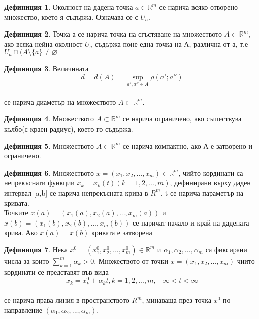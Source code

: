\documentclass[a4paper,fleqn,12pt]{article}
\theoremstyle{definition}
\newtheorem{definition}{Дефиниция}[subsection]
\begin{document}
\begin{definition}
Околност на дадена точка $a \in \mathbb{R}^m $ се нарича всяко отворено множество, което я съдържа. Означава се с $U_a$.
\end{definition}

\begin{definition}
Точка а се нарича точка на сгъстяване на множеството $A \subset \mathbb{R}^m $, ако всяка нейна околност $U_a$ съдържа поне една точка на А, различна от а, т.е $U_a \cap (A\setminus \{ a \} \neq \varnothing $
\end{definition}

\begin{definition}
Величината \\
$$d = d(A) = \sup_{a',a'' \in A} \rho(a';a'')$$\\
се нарича диаметър на множеството  $A \subset \mathbb{R}^m $.
\end{definition}

\begin{definition}
Множеството  $A \subset \mathbb{R}^m $ се нарича ограничено, ако съшествува кълбо(с краен радиус), което го съдържа.
\end{definition}

\begin{definition}
Множеството  $A \subset \mathbb{R}^m $ се нарича компактно, ако А е затворено и ограничено.
\end{definition}

\begin{definition}
Множеството   $x = (x_1, x_2, ... , x_m) \in \mathbb{R}^m $, чийто кординати са непрекъснати функции $x_k = x_k(t) (k = 1, 2, ..., m)$, дефинирани върху даден интервал [a,b] се нарича непрекъсната крива в $R^m$. t се нарича параметър на кривата.\\
Точките $x(a) = (x_1(a), x_2(a), ... , x_m(a))$ и $x(b) = (x_1(b), x_2(b), ... , x_m(b))$ се наричат начало и край на дадената крива. Ако $x(a) = x(b)$ кривата е затворена
\end{definition}

\begin{definition}
Нека $x^0 = (x_1^0, x_2^0, ... , x_m^0) \in \mathbb{R}^m$ и $\alpha_1, \alpha_2, ... , \alpha_m$ са фиксирани числа за които $\sum_{k=1}^{m}\alpha_k > 0$. Множеството от точки $x = (x_1, x_2, ... , x_m)$ чиито кординати се представят във вида \\
$$x_k = x_k^0 + \alpha_kt, k = 1, 2, ..., m , -\infty < t <\infty $$\\
се нарича права линия в пространството $R^m$, минаваща през точка $x^0$ по направление $(\alpha_1, \alpha_2, ... , \alpha_m).$
\end{definition}
\end{document}
